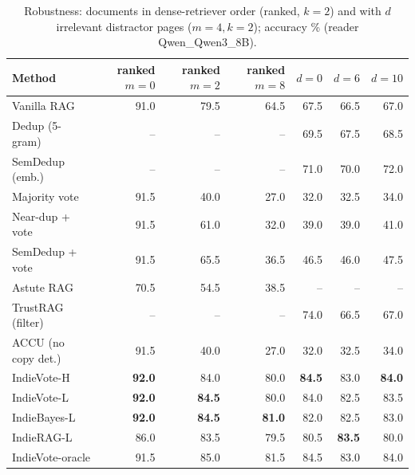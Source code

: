 \begin{table}[tbp]
\centering
\small
\caption{Robustness: documents in dense-retriever order (ranked, $k{=}2$) and with $d$ irrelevant distractor pages ($m{=}4,k{=}2$); accuracy \% (reader Qwen\_Qwen3\_8B).}
\label{tab:robust:Qwen_Qwen3_8B}
\setlength{\tabcolsep}{4pt}
\begin{tabular}{lrrrrrr}
\toprule
Method & ranked $m{=}0$ & ranked $m{=}2$ & ranked $m{=}8$ & $d{=}0$ & $d{=}6$ & $d{=}10$ \\
\midrule
Vanilla RAG & 91.0 & 79.5 & 64.5 & 67.5 & 66.5 & 67.0 \\
Dedup (5-gram) & -- & -- & -- & 69.5 & 67.5 & 68.5 \\
SemDedup (emb.) & -- & -- & -- & 71.0 & 70.0 & 72.0 \\
Majority vote & 91.5 & 40.0 & 27.0 & 32.0 & 32.5 & 34.0 \\
Near-dup + vote & 91.5 & 61.0 & 32.0 & 39.0 & 39.0 & 41.0 \\
SemDedup + vote & 91.5 & 65.5 & 36.5 & 46.5 & 46.0 & 47.5 \\
Astute RAG & 70.5 & 54.5 & 38.5 & -- & -- & -- \\
TrustRAG (filter) & -- & -- & -- & 74.0 & 66.5 & 67.0 \\
ACCU (no copy det.) & 91.5 & 40.0 & 27.0 & 32.0 & 32.5 & 34.0 \\
IndieVote-H & \textbf{92.0} & 84.0 & 80.0 & \textbf{84.5} & 83.0 & \textbf{84.0} \\
IndieVote-L & \textbf{92.0} & \textbf{84.5} & 80.0 & 84.0 & 82.5 & 83.5 \\
IndieBayes-L & \textbf{92.0} & \textbf{84.5} & \textbf{81.0} & 82.0 & 82.5 & 83.0 \\
IndieRAG-L & 86.0 & 83.5 & 79.5 & 80.5 & \textbf{83.5} & 80.0 \\
IndieVote-oracle & 91.5 & 85.0 & 81.5 & 84.5 & 83.0 & 84.0 \\
\bottomrule
\end{tabular}
\end{table}
